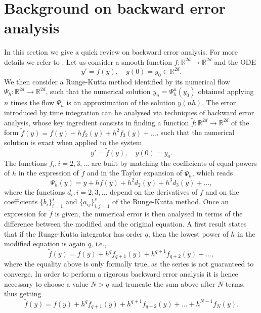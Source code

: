 \documentclass{siamart1116}
\numberwithin{theorem}{section}
\newcommand{\R}{\mathbb{R}}
\newcommand{\corr}[1]{{\color{red}#1}}
\begin{document}
\section{Background on backward error analysis}\label{sec:BEA} \corr{In this section we give a quick review on backward error analysis. For more details we refer to \cite{HLW06, LeR04, SaC94}}. Let us consider a smooth function $f \colon \R^{2d} \to \R^{2d}$ and the ODE
\begin{equation}
	y' = f(y), \quad y(0) = y_0 \in \R^{2d}.
\end{equation}
We then consider a Runge-Kutta method identified by its numerical flow $\Psi_h \colon \R^{2d} \to \R^{2d}$, such that the numerical solution $y_n = \Psi_h^n(y_0)$ obtained applying $n$ times the flow $\Psi_h$ is an approximation of the solution $y(nh)$. The error introduced by time integration can be analysed via techniques of backward error analysis, whose key ingredient consists in finding a function $\tilde f\colon \R^{2d} \to \R^{2d}$ of the form $\tilde f(y) = f(y) + hf_2(y) + h^2 f_3(y) + \ldots$, such that the numerical solution is exact when applied to the system 
\begin{equation}
	y' = \tilde f(y), \quad y(0) = y_0.
\end{equation}
The functions $f_i, i = 2, 3, \ldots$ are built \corr{by} matching the coefficients of equal powers of $h$ in the expression of $\tilde f$ and in the Taylor expansion of $\Psi_h$, which reads
\begin{equation}
	\Psi_h(y) = y + h f(y) + h^2 d_2(y) + h^3 d_3(y) + \ldots,  
\end{equation}
where the functions $d_i, i = 2, 3, \ldots$ depend on the derivatives of $f$ and on the coefficients $\{b_i\}_{i=1}^s$ and $\{a_{ij}\}_{i,j=1}^s$ of the Runge-Kutta method. Once an expression for $\tilde f$ is given, the numerical error is then analysed in terms of the difference between the modified and the original equation. A first result states that if the Runge-Kutta integrator has order $q$, then the lowest power of $h$ in the modified equation is again $q$, i.e.,
\begin{equation}
	\tilde f(y) = f(y) + h^q f_{q+1}(y) + h^{q+1} f_{q+2}(y) + \ldots,
\end{equation}
where the equality above is only formally true, as the series is not guaranteed to converge. In order to perform a rigorous backward error analysis it is hence necessary to choose a value $N > q$ and truncate the sum above after $N$ terms, thus getting 
\begin{equation}
	\tilde f(y) = f(y) + h^q f_{q+1}(y) + h^{q+1} f_{q+2}(y) + \ldots + h^{N-1}f_N(y).
\end{equation}
\end{document}
